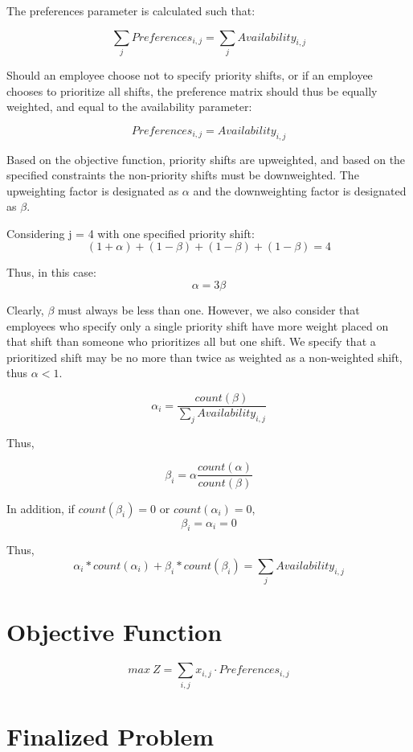 The preferences parameter is calculated such that:

$$\sum\limits_{j}Preferences_{i,j} = \sum\limits_{j}Availability_{i,j}$$

Should an employee choose not to specify priority shifts, or if an employee chooses to prioritize all shifts, the preference matrix should thus be equally weighted, and equal to the availability parameter:

$$Preferences_{i,j} = Availability_{i,j}$$

Based on the objective function, priority shifts are upweighted, and based on the specified constraints the non-priority shifts must be downweighted. The upweighting factor is designated as $\alpha$ and the downweighting factor is designated as $\beta$. 

Considering j = 4 with one specified priority shift:
$$ (1 + \alpha) + (1-\beta) + (1-\beta) + (1-\beta) = 4 $$

Thus, in this case: $$\alpha = 3\beta$$

Clearly, $\beta$ must always be less than one. However, we also consider that employees who specify only a single priority shift have more weight placed on that shift than someone who prioritizes all but one shift.  We specify that a prioritized shift may be no more than twice as weighted as a non-weighted shift, thus $\alpha<1$.

$$\alpha_{i} = \frac{count(\beta)}{\sum\limits_{j}Availability_{i,j}}$$

Thus,

$$\beta_{i} = \alpha \frac{count(\alpha)}{count(\beta)}$$

In addition, if $count(\beta_{i})=0$ or $count(\alpha_{i})=0$,
$$ \beta_{i} = \alpha_{i} = 0 $$ 

Thus, 
$$ \alpha_{i}*count(\alpha_{i}) +\beta_{i} * count(\beta_{i}) = \sum\limits_{j}Availability_{i,j}$$


\section{Objective Function}

$$ max~Z = \sum\limits_{i,j} x_{i,j} \cdot Preferences_{i,j}$$

\section{Finalized Problem}
